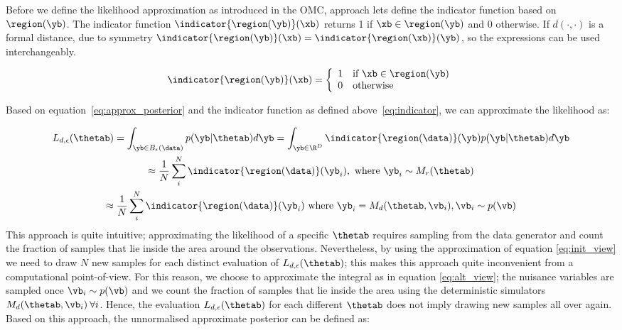 Before we define the likelihood approximation as introduced in the
OMC, approach lets define the indicator function based on
$\region(\yb)$. The indicator function $\indicator{\region(\yb)}(\xb)$
returns 1 if $\xb \in \region(\yb)$ and 0 otherwise. If
$d(\cdot,\cdot)$ is a formal distance, due to symmetry
$\indicator{\region(\yb)}(\xb) = \indicator{\region(\xb)}(\yb)$, so
the expressions can be used interchangeably.

\begin{gather} \label{eq:indicator} \indicator{\region(\yb)}(\xb)=
  \left\{
    \begin{array}{ll}
      1 & \mbox{if } \xb \in \region(\yb) \\
      0 & \mbox{otherwise} 
    \end{array} \right. \end{gather}

\noindent
Based on equation~\eqref{eq:approx_posterior} and the indicator
function as defined above~\eqref{eq:indicator}, we can approximate the
likelihood as:

\begin{gather} \label{eq:approx_likelihood_omc}
  L_{d, \epsilon}(\thetab) =
  \int_{\yb \in B_\epsilon(\data)}p(\yb|\thetab)d\yb =
  \int_{\yb \in \R^D} \indicator{\region(\data)}(\yb)p(\yb|\thetab)d\yb\\
  \approx \frac{1}{N} \sum_i^N \indicator{\region(\data)}(\yb_i),\text{ where }
  \yb_i \sim M_r(\thetab) \label{eq:init_view}\\
  \approx \frac{1}{N} \sum_i^N \indicator{\region (\data)} (\yb_i)
  \text{ where } \yb_i = M_d(\thetab, \vb_i), \vb_i \sim p(\vb) \label{eq:alt_view}
\end{gather}
%
This approach is quite intuitive; approximating the likelihood of a
specific $\thetab$ requires sampling from the data generator and count
the fraction of samples that lie inside the area around the
observations. Nevertheless, by using the approximation of equation
\eqref{eq:init_view} we need to draw $N$ new samples for each distinct
evaluation of $L_{d,\epsilon}(\thetab)$; this makes this approach
quite inconvenient from a computational point-of-view. For this
reason, we choose to approximate the integral as in equation
\eqref{eq:alt_view}; the nuisance variables are sampled once
$\vb_i \sim p(\vb)$ and we count the fraction of samples that lie
inside the area using the deterministic simulators
$M_d(\thetab, \vb_i) \: \forall i$. Hence, the evaluation
$L_{d,\epsilon}(\thetab)$ for each different $\thetab$ does not imply
drawing new samples all over again. Based on this approach, the
unnormalised approximate posterior can be defined as:

